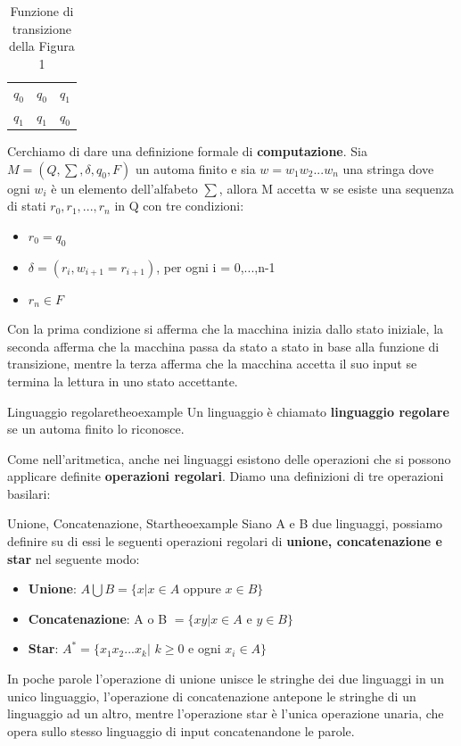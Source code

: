 \documentclass[a4paper]{extarticle}
\begin{document}
\begin{table}[h!]
\centering
\begin{tabularx}{0.8\textwidth} { 
  | >{\centering\arraybackslash}X 
  | >{\centering\arraybackslash}X 
  | >{\centering\arraybackslash}X | }
 \hline
   & 0 & 1 \\
 \hline
  $q_0$  & $q_0$  & $q_1$  \\
 \hline
  $q_1$ & $q_1$  & $q_0$ \\
 \hline
\end{tabularx}
\caption{Funzione di transizione della Figura 1}
\label{table:1}
\end{table}

Cerchiamo di dare una definizione formale di \textbf{computazione}. Sia $M = (Q,\sum , \delta, q_0,F)$ un automa finito e sia $w=w_1w_2...w_n$ una stringa dove ogni $w_i$ è un elemento dell'alfabeto $\sum$, allora M accetta w se esiste una sequenza  di stati $r_0,r_1,...,r_n$ in Q con tre condizioni:
\begin{itemize}
\item $r_0=q_0$
\item $\delta = (r_i,w_{i+1}=r_{i+1})$, per ogni i = 0,...,n-1
\item $r_n \in F$
\end{itemize}

Con la prima condizione si afferma che la macchina inizia dallo stato iniziale, la seconda afferma che la macchina passa da stato a stato in base alla funzione di transizione, mentre la terza afferma che la macchina accetta il suo input se termina la lettura in uno stato accettante.

\begin{definizione}{Linguaggio regolare}{theoexample}
 Un linguaggio è chiamato \textbf{linguaggio regolare} se un automa finito lo riconosce.
\end{definizione}

Come nell'aritmetica, anche nei linguaggi esistono delle operazioni che si possono applicare definite \textbf{operazioni regolari}. Diamo una definizioni di tre operazioni basilari:

\begin{definizione}{Unione, Concatenazione, Star}{theoexample}
Siano A e B due linguaggi, possiamo definire su di essi le seguenti operazioni regolari di \textbf{unione, concatenazione e star} nel seguente modo:
\begin{itemize}
\item \textbf{Unione}: $A \bigcup B = \{ x | x \in A$  oppure  $x \in B \}$
\item \textbf{Concatenazione}: A o B $= \{ xy | x \in A$ e $ y \in B \}$
\item \textbf{Star}: $A^* = \{x_1x_2...x_k|$ $k\geq 0$ e ogni $x_i \in A \}$
\end{itemize}
\end{definizione}
In poche parole l'operazione di unione unisce le stringhe dei due linguaggi in un unico linguaggio, l'operazione di concatenazione antepone le stringhe di un linguaggio ad un altro, mentre l'operazione star è l'unica operazione unaria, che opera sullo stesso linguaggio di input concatenandone le parole.
\end{document}
